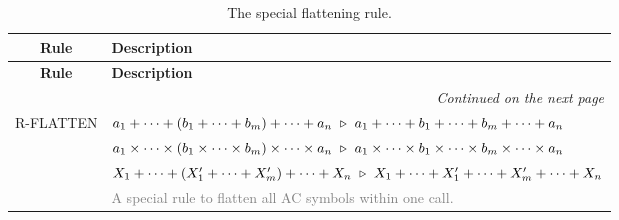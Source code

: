 \documentclass{article}
\begin{document}
\newenvironment{ruletable}[1]
{
    \begin{longtable}{cl}
    \caption{#1}\\
    \hline
    \textbf{Rule} & \textbf{Description} \\
    \hline
    \endfirsthead

    \hline
    \textbf{Rule} & \textbf{Description} \\
    \hline
    \endhead

    \hline
    \multicolumn{2}{r}{\textit{Continued on the next page}} \\
    \hline
    \endfoot

    \hline
    \endlastfoot
}
{
    \end{longtable}
}

\renewcommand{\arraystretch}{1.2} %

\begin{ruletable}{The special flattening rule.}
    R-FLATTEN
    & $a_1 + \cdots + (b_1 + \cdots + b_m) + \cdots + a_n\ \triangleright\ a_1 + \cdots + b_1 + \cdots + b_m + \cdots + a_n$ \\
    & $a_1 \times \cdots \times (b_1 \times \cdots \times b_m) \times \cdots \times a_n\ \reduce\ a_1 \times \cdots \times b_1 \times \cdots \times b_m \times \cdots \times a_n$ \\
    & $X_1 + \cdots + (X_1' + \cdots + X_m') + \cdots + X_n\ \triangleright\ X_1 + \cdots + X_1' + \cdots + X_m' + \cdots + X_n$ \\
    & \textcolor{gray}{A special rule to flatten all AC symbols within one call.}    
\end{ruletable}
\end{document}

